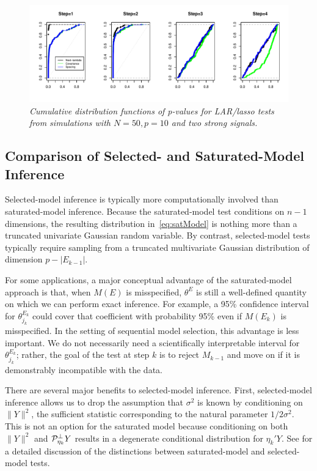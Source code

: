 \documentclass{article}
\begin{document}
\begin{figure}
  \includegraphics[width=\textwidth]{figs/larexample.pdf}
  \caption[fig:larexample]{\em  Cumulative distribution functions of p-values for LAR/lasso tests from simulations with $N=50,  p=10$ and two strong signals.}
  \label{fig:larexample}
\end{figure}

\subsection{Comparison of Selected- and Saturated-Model Inference}\label{sec:bivariate}


Selected-model inference is typically more computationally involved than saturated-model inference. Because the saturated-model test conditions on $n-1$ dimensions, the resulting distribution in~\eqref{eq:satModel} is nothing more than a truncated univariate Gaussian random variable. By contrast, selected-model tests typically require sampling from a truncated multivariate Gaussian distribution of dimension $p-|E_{k-1}|$.

For some applications, a major conceptual advantage of the saturated-model approach is that, when $M(E)$ is misspecified, $\theta^{E}$ is still a well-defined quantity on which we can perform exact inference. For example, a 95\% confidence interval for $\theta_{j_k}^{E_k}$ could cover that coefficient with probability 95\% even if $M(E_k)$ is misspecified. In the setting of sequential model selection, this advantage is less important. We do not necessarily need a scientifically interpretable interval for $\theta_{j_k}^{E_k}$; rather, the goal of the test at step $k$ is to reject $M_{k-1}$ and move on if it is demonstrably incompatible with the data.

There are several major benefits to selected-model inference. First, selected-model inference allows us to drop the assumption that $\sigma^2$ is known by conditioning on $\|Y\|^2$, the sufficient statistic corresponding to the natural parameter $1/2\sigma^2$. This is not an option for the saturated model because conditioning on both $\|Y\|^2$ and $\mathcal{P}_{\eta_k}^\perp Y$ results in a degenerate conditional distribution for $\eta_k'Y$.  See \citet[][Section 5]{fithian2014optimal} for a detailed discussion of the distinctions between saturated-model and selected-model tests.
\end{document}
